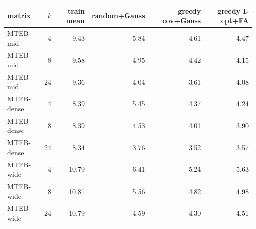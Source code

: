 \begin{tabular}{lrrrrr}\toprule
matrix & $k$ & train mean & random+Gauss & greedy cov+Gauss & greedy I-opt+FA \\\midrule
MTEB-mid & 4 & 9.43 & 5.84 & 4.61 & 4.47 \\
MTEB-mid & 8 & 9.58 & 4.95 & 4.42 & 4.15 \\
MTEB-mid & 24 & 9.36 & 4.04 & 3.61 & 4.08 \\
MTEB-dense & 4 & 8.39 & 5.45 & 4.37 & 4.24 \\
MTEB-dense & 8 & 8.39 & 4.53 & 4.01 & 3.90 \\
MTEB-dense & 24 & 8.34 & 3.76 & 3.52 & 3.57 \\
MTEB-wide & 4 & 10.79 & 6.41 & 5.24 & 5.63 \\
MTEB-wide & 8 & 10.81 & 5.56 & 4.82 & 4.98 \\
MTEB-wide & 24 & 10.79 & 4.59 & 4.30 & 4.51 \\
\bottomrule\end{tabular}
